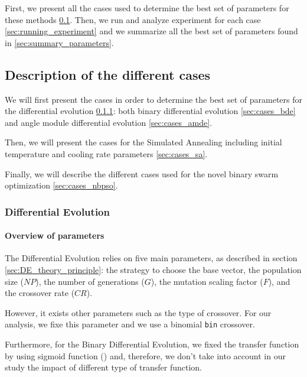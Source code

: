 \documentclass[12pt, openany]{article}
\begin{document}
First, we present all the cases used to determine the best set of parameters for these methods \ref{sec:description_cases}. Then, we run and analyze experiment for each case \ref{sec:running_experiment} and we summarize all the best set of parameters found in \ref{sec:summary_parameters}.

\subsection{Description of the different cases}\label{sec:description_cases}

We will first present the cases in order to determine the best set of parameters for the differential evolution \ref{sec:cases_de}: both binary differential evolution \ref{sec:cases_bde} and angle module differential evolution \ref{sec:cases_amde}.

Then, we will present the cases for the Simulated Annealing including initial temperature and cooling rate parameters \ref{sec:cases_sa}.

Finally, we will describe the different cases used for the novel binary swarm optimization \ref{sec:cases_nbpso}.

\subsubsection{Differential Evolution}\label{sec:cases_de}

\paragraph{Overview of parameters}

The Differential Evolution relies on five main parameters, as described in section \ref{sec:DE_theory_principle}: the strategy to choose the base vector, the population size ($NP$), the number of generations ($G$), the mutation scaling factor ($F$), and the crossover rate ($CR$).

However, it exists other parameters such as the type of crossover. For our analysis, we fixe this parameter and we use a binomial \texttt{bin} crossover.

Furthermore, for the Binary Differential Evolution, we fixed the transfer function by using sigmoid function () and, therefore, we don't take into account in our study the impact of different type of transfer function.


\label{sec:cases_bde}
\end{document}
